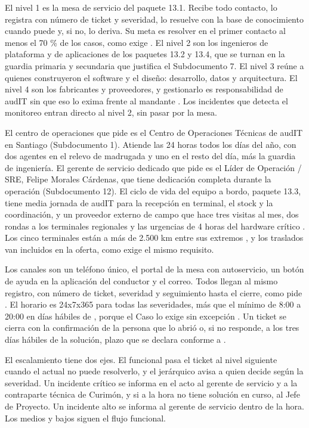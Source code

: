 El nivel 1 es la mesa de servicio del paquete 13.1. Recibe todo contacto, lo registra con número de
ticket y severidad, lo resuelve con la base de conocimiento cuando puede y, si no, lo deriva. Su meta es
resolver en el primer contacto al menos el 70 \% de los casos, como exige . El
nivel 2 son los ingenieros de plataforma y de aplicaciones de los paquetes 13.2 y 13.4, que se turnan
en la guardia primaria y secundaria que justifica el Subdocumento 7. El nivel 3 reúne
a quienes construyeron el software y el diseño: desarrollo, datos y arquitectura. El nivel 4 son los
fabricantes y proveedores, y gestionarlo es responsabilidad de audIT sin que eso lo exima frente al
mandante . Los incidentes que detecta el monitoreo entran directo al nivel 2,
sin pasar por la mesa.

El centro de operaciones que pide  es el Centro de Operaciones Técnicas de audIT en
Santiago (Subdocumento 1). Atiende las 24 horas todos los días del año, con dos agentes en el relevo de
madrugada y uno en el resto del día, más la guardia de ingeniería. El gerente de servicio dedicado que
pide  es el Líder de Operación / SRE, Felipe Morales Cárdenas, que tiene dedicación
completa durante la operación (Subdocumento 12). El ciclo de vida del equipo a bordo, paquete 13.3,
tiene media jornada de audIT para la recepción en terminal, el stock y la coordinación, y un proveedor
externo de campo que hace tres visitas al mes, dos rondas a los terminales regionales y las urgencias
de 4 horas del hardware crítico . Los cinco terminales están a más de 2.500 km
entre sus extremos , y los traslados van incluidos en la oferta, como exige el
mismo requisito.

Los canales son un teléfono único, el portal de la mesa con autoservicio, un botón de ayuda en la
aplicación del conductor y el correo. Todos llegan al mismo registro, con número de ticket, severidad y
seguimiento hasta el cierre, como pide . El horario es 24x7x365 para todas las
severidades, más que el mínimo de 8:00 a 20:00 en días hábiles de , porque el Caso
lo exige sin excepción . Un ticket se cierra con la confirmación de la persona que lo
abrió o, si no responde, a los tres días hábiles de la solución, plazo que se declara conforme a
.

El escalamiento tiene dos ejes. El funcional pasa el ticket al nivel siguiente cuando el actual no puede
resolverlo, y el jerárquico avisa a quien decide según la severidad. Un incidente crítico se informa en
el acto al gerente de servicio y a la contraparte técnica de Curimón, y si a la hora no tiene solución
en curso, al Jefe de Proyecto. Un incidente alto se informa al gerente de servicio dentro de la hora.
Los medios y bajos siguen el flujo funcional.

